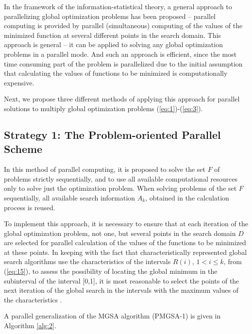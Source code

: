 \documentclass[review]{elsarticle}
\begin{document}
In the framework of the information-statistical theory, a general approach to parallelizing global optimization problems has been proposed -- parallel computing is provided by parallel (simultaneous) computing of the values of the minimized function at several different points in the search domain. This approach is general -- it can be applied to solving any global optimization problems in a parallel mode. And such an approach is efficient, since the most time consuming part of the problem is parallelized due to the initial assumption that calculating the values of functions to be minimized is computationally expensive.

Next, we propose three different methods of applying this approach for parallel solutions to multiply global optimization problems (\ref{eq:1})-(\ref{eq:3}).

\subsection{Strategy 1: The Problem-oriented Parallel Scheme} \label{subsec:1}

In this method of parallel computing, it is proposed to solve the set $F$ of problems strictly sequentially, and to use all available computational resources only to solve just the optimization problem. When solving problems of the set $F$ sequentially, all available search information $A_k$, obtained in the calculation process is reused. 

To implement this approach, it is necessary to ensure that at each iteration of the global optimization problem, not one, but several points in the search domain $D$ are selected for parallel calculation of the values of the functions to be minimized at these points. In keeping with the fact that characteristically represented global search algorithms use the characteristics of the intervals $R(i)$, $1 < i \leq k$, from (\ref{eq:15}), to assess the possibility of locating the global minimum in the subinterval of the interval [0,1], it is most reasonable to select the points of the next iteration of the global search in the intervals with the maximum values of the characteristics \cite{c6}.

A parallel generalization of the MGSA algorithm (PMGSA-1) is given in Algorithm \ref{alg:2}.
\end{document}
